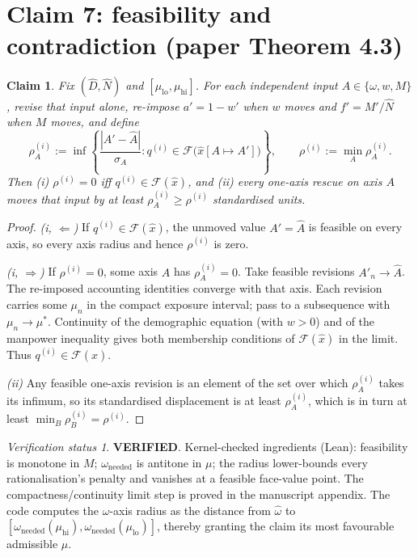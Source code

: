\documentclass[11pt,a4paper]{article}
\theoremstyle{plain}
\newtheorem{claim}{Claim}
\theoremstyle{remark}
\newtheorem*{verification}{Verification status}
\newcommand{\PASS}{\textcolor{green!50!black}{\textbf{VERIFIED}}}
\begin{document}
\section{Claim 7: feasibility and contradiction (paper Theorem 4.3)}

\begin{claim}
Fix $(\hat D,\hat N)$ and $[\mu_{\mathrm{lo}},\mu_{\mathrm{hi}}]$. For each independent input $A\in\{\omega,w,M\}$, revise that input alone, re-impose $a'=1-w'$ when $w$ moves and $f'=M'/\hat N$ when $M$ moves, and define
\[
\rho_A^{(i)}
:=\inf\left\{\frac{|A'-\hat A|}{\sigma_A}:
q^{(i)}\in\mathcal F\bigl(\hat x[A\mapsto A']\bigr)\right\},
\qquad
\rho^{(i)}:=\min_A\rho_A^{(i)}.
\]
Then (i) $\rho^{(i)}=0$ iff $q^{(i)}\in\mathcal F(\hat x)$, and (ii) every one-axis rescue on axis $A$ moves that input by at least $\rho_A^{(i)}\ge\rho^{(i)}$ standardised units.
\end{claim}

\begin{proof}
\emph{(i, $\Leftarrow$)} If $q^{(i)}\in\mathcal F(\hat x)$, the unmoved value $A'=\hat A$ is feasible on every axis, so every axis radius and hence $\rho^{(i)}$ is zero.

\emph{(i, $\Rightarrow$)} If $\rho^{(i)}=0$, some axis $A$ has $\rho_A^{(i)}=0$. Take feasible revisions $A'_n\to\hat A$. The re-imposed accounting identities converge with that axis. Each revision carries some $\mu_n$ in the compact exposure interval; pass to a subsequence with $\mu_n\to\mu^\ast$. Continuity of the demographic equation (with $w>0$) and of the manpower inequality gives both membership conditions of $\mathcal F(\hat x)$ in the limit. Thus $q^{(i)}\in\mathcal F(\hat x)$.

\emph{(ii)} Any feasible one-axis revision is an element of the set over which $\rho_A^{(i)}$ takes its infimum, so its standardised displacement is at least $\rho_A^{(i)}$, which is in turn at least $\min_B\rho_B^{(i)}=\rho^{(i)}$.
\end{proof}

\begin{verification}
\PASS. Kernel-checked ingredients (Lean): feasibility is monotone in $M$; $\omega_{\mathrm{needed}}$ is antitone in $\mu$; the radius lower-bounds every rationalisation's penalty and vanishes at a feasible face-value point. The compactness/continuity limit step is proved in the manuscript appendix. The code computes the $\omega$-axis radius as the distance from $\hat\omega$ to $[\omega_{\mathrm{needed}}(\mu_{\mathrm{hi}}),\omega_{\mathrm{needed}}(\mu_{\mathrm{lo}})]$, thereby granting the claim its most favourable admissible $\mu$.
\end{verification}
\end{document}
